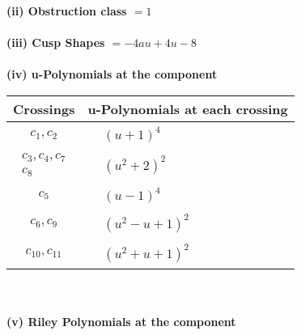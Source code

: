 \documentclass[1p]{elsarticle_modified}
\theoremstyle{definition}
\begin{document}
\flushleft \textbf{(ii) Obstruction class $= 1$}\\~\\
\flushleft \textbf{(iii) Cusp Shapes $= -4 a u+4 u-8$}\\~\\
\newpage\renewcommand{\arraystretch}{1}
\flushleft \textbf{(iv) u-Polynomials at the component}\newline \\
\begin{tabular}{m{50pt}|m{274pt}}
Crossings & \hspace{64pt}u-Polynomials at each crossing \\
\hline $$\begin{aligned}c_{1},c_{2}\end{aligned}$$&$\begin{aligned}
&(u+1)^4
\end{aligned}$\\
\hline $$\begin{aligned}c_{3},c_{4},c_{7}\\c_{8}\end{aligned}$$&$\begin{aligned}
&(u^2+2)^2
\end{aligned}$\\
\hline $$\begin{aligned}c_{5}\end{aligned}$$&$\begin{aligned}
&(u-1)^4
\end{aligned}$\\
\hline $$\begin{aligned}c_{6},c_{9}\end{aligned}$$&$\begin{aligned}
&(u^2- u+1)^2
\end{aligned}$\\
\hline $$\begin{aligned}c_{10},c_{11}\end{aligned}$$&$\begin{aligned}
&(u^2+u+1)^2
\end{aligned}$\\
\hline
\end{tabular}\\~\\
\newpage\renewcommand{\arraystretch}{1}
\flushleft \textbf{(v) Riley Polynomials at the component}\newline \\
\end{document}
